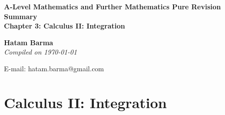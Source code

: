 \documentclass[11pt, a4paper]{article}
\begin{document}
\begin{titlepage}
   \begin{center}
       \vspace*{2.5cm}
	\huge
       \textbf{A-Level Mathematics and Further Mathematics Pure Revision Summary} \\
	\vspace{1cm}
	\Large
       \textbf{Chapter 3: Calculus II: Integration}
            
       \vspace{1.5cm}
	\LARGE
       \textbf{Hatam Barma} \\
	\vspace{0.75cm}
       \normalsize
       \emph{Compiled on \Datea\today} \\

       \vfill
        

	E-mail: hatam.barma@gmail.com
   \end{center}
\end{titlepage}


\tableofcontents

\clearpage
\section{Calculus II: Integration}
\vspace{0.5cm}
\end{document}
